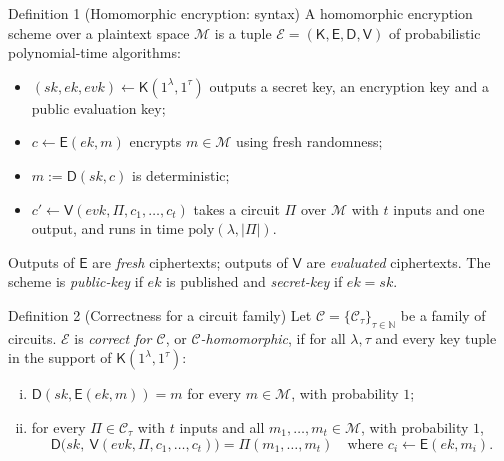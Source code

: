 \documentclass[11pt,a4paper]{article}
\newcommand{\Enc}{\mathsf{E}}
\newcommand{\Dec}{\mathsf{D}}
\newcommand{\Eval}{\mathsf{V}}
\newcommand{\KeyGen}{\mathsf{K}}
\newcommand{\sk}{\mathit{sk}}
\newcommand{\ek}{\mathit{ek}}
\newcommand{\evk}{\mathit{evk}}
\newcommand{\Msg}{\mathcal{M}}
\newcommand{\indcpa}{\textsf{IND-CPA}}
\begin{document}
\begin{formal}{Definition 1 (Homomorphic encryption: syntax)}
A homomorphic encryption scheme over a plaintext space $\Msg$ is a tuple
$\mathcal{E}=(\KeyGen,\Enc,\Dec,\Eval)$ of probabilistic polynomial-time
algorithms:
\begin{itemize}[leftmargin=*]
\item $(\sk,\ek,\evk)\gets\KeyGen(1^\lambda,1^\tau)$ outputs a secret key, an
  encryption key and a public evaluation key;
\item $c\gets\Enc(\ek,m)$ encrypts $m\in\Msg$ using fresh randomness;
\item $m:=\Dec(\sk,c)$ is deterministic;
\item $c'\gets\Eval(\evk,\Pi,c_1,\dots,c_t)$ takes a circuit $\Pi$ over $\Msg$
  with $t$ inputs and one output, and runs in time $\mathrm{poly}(\lambda,|\Pi|)$.
\end{itemize}
Outputs of $\Enc$ are \emph{fresh} ciphertexts; outputs of $\Eval$ are
\emph{evaluated} ciphertexts. The scheme is \emph{public-key} if $\ek$ is
published and \emph{secret-key} if $\ek=\sk$.
\end{formal}

\begin{formal}{Definition 2 (Correctness for a circuit family)}
Let $\mathcal{C}=\{\mathcal{C}_\tau\}_{\tau\in\mathbb{N}}$ be a family of
circuits. $\mathcal{E}$ is \emph{correct for $\mathcal{C}$}, or
\emph{$\mathcal{C}$-homomorphic}, if for all $\lambda,\tau$ and every key
tuple in the support of $\KeyGen(1^\lambda,1^\tau)$:
\begin{enumerate}[(i),leftmargin=*]
\item $\Dec(\sk,\Enc(\ek,m))=m$ for every $m\in\Msg$, with probability $1$;
\item for every $\Pi\in\mathcal{C}_\tau$ with $t$ inputs and all
  $m_1,\dots,m_t\in\Msg$, with probability $1$,
  \[
  \Dec\bigl(\sk,\ \Eval(\evk,\Pi,c_1,\dots,c_t)\bigr)=\Pi(m_1,\dots,m_t)
  \quad\text{where } c_i\gets\Enc(\ek,m_i).
  \]
\end{enumerate}
\end{formal}

\end{document}
